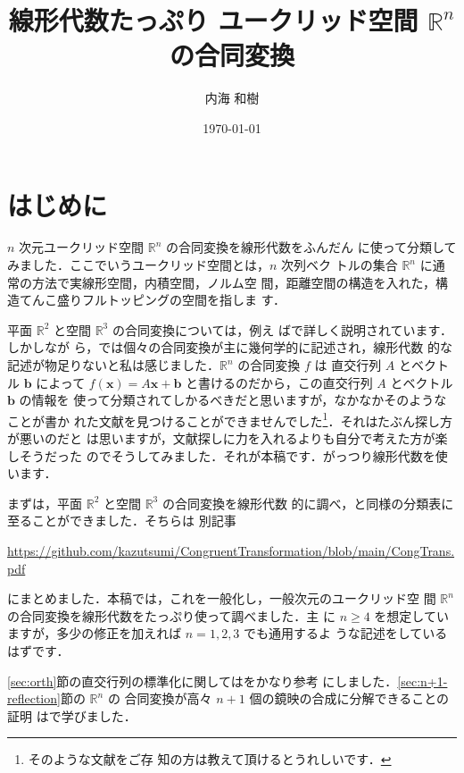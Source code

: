 \documentclass[11pt, uplatex, dvipdfmx, titlepage]{jsarticle}
\theoremstyle{definition}
\begin{document}
\title{線形代数たっぷり ユークリッド空間 $\mathbb{R}^n$ の合同変換}
\author{内海 和樹}
\date{\today}

\maketitle
  


\section*{はじめに}


$n$ 次元ユークリッド空間 $\mathbb{R}^n$ の合同変換を線形代数をふんだん
に使って分類してみました．ここでいうユークリッド空間とは，$n$ 次列ベク
トルの集合 $\mathbb{R}^n$ に通常の方法で実線形空間，内積空間，ノルム空
間，距離空間の構造を入れた，構造てんこ盛りフルトッピングの空間を指しま
す．

平面 $\mathbb{R}^2$ と空間 $\mathbb{R}^3$ の合同変換については，例え
ば\cite{Kawasaki}で詳しく説明されています．しかしなが
ら，\cite{Kawasaki}では個々の合同変換が主に幾何学的に記述され，線形代数
的な記述が物足りないと私は感じました．$\mathbb{R}^n$ の合同変換 $f$ は
直交行列 $A$ とベクトル $\bm{b}$ によって $f(\bm{x}) = A\bm{x} +
\bm{b}$ と書けるのだから，この直交行列 $A$ とベクトル $\bm{b}$ の情報を
使って分類されてしかるべきだと思いますが，なかなかそのようなことが書か
れた文献を見つけることができませんでした\footnote{そのような文献をご存
  知の方は教えて頂けるとうれしいです．}．それはたぶん探し方が悪いのだと
は思いますが，文献探しに力を入れるよりも自分で考えた方が楽しそうだった
のでそうしてみました．それが本稿です．がっつり線形代数を使います．

まずは，平面 $\mathbb{R}^2$ と空間 $\mathbb{R}^3$ の合同変換を線形代数
的に調べ，\cite{Kawasaki}と同様の分類表に至ることができました．そちらは
別記事
\begin{center}
  \url{https://github.com/kazutsumi/CongruentTransformation/blob/main/CongTrans.pdf}
\end{center}
にまとめました．本稿では，これを一般化し，一般次元のユークリッド空
間 $\mathbb{R}^n$ の合同変換を線形代数をたっぷり使って調べました．主
に $n \geq 4$ を想定していますが，多少の修正を加えれば $n=1,2,3$ でも通用するよ
うな記述をしているはずです．

\ref{sec:orth}節の直交行列の標準化に関しては\cite{Fujioka}をかなり参考
にしました．\ref{sec:n+1-reflection}節の $\mathbb{R}^n$ の
合同変換が高々 $n+1$ 個の鏡映の合成に分解できることの証明
は\cite{Iwahori}で学びました．
\end{document}
